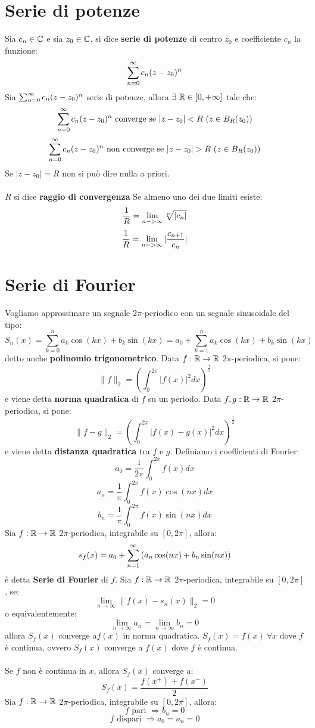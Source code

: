 \section{Serie di potenze}
Sia $c_n \in \mathbb{C}$ e sia $z_0 \in \mathbb{C}$, si dice \textbf{serie di potenze} di centro $z_0$ e coefficiente $c_n$ la funzione:
$$\sum_{n=0}^{\infty} c_n (z-z_0)^n$$
\thh
Sia $\sum_{n=0}^{\infty} c_n (z-z_0)^n$ serie di potenze, allora $\exists \ \mathbb{R} \in [0, +\infty] $ tale che:
$$\sum_{n=0}^{\infty} c_n (z-z_0)^n  \text{ converge se } |z-z_0|<R \ (z \in B_R(z_0))$$
$$\suminf{0} c_n (z-z_0)^n  \text{ non converge se } |z-z_0|>R \ (z \in B_R(z_0))$$
Se $|z-z_0|=R$ non si può dire nulla a priori.\\
\\
$R$ si dice \textbf{raggio di convergenza}
\prop
Se almeno uno dei due limiti esiste:
$$\frac{1}{R}=\lim\limits_{n->\infty} \sqrt[n]{|c_n|}$$
$$\frac{1}{R}=\lim\limits_{n->\infty} |\frac{c_{n+1}}{c_n}|$$
\section{Serie di Fourier}
Vogliamo approssimare un segnale $2\pi$-periodico con un segnale sinusoidale del tipo:
$$S_n(x)=\sum_{k=0}^{n}a_k \cos{(kx)} + b_k \sin{(kx)}=a_0+\sum_{k=1}^{n}a_k \cos{(kx)} + b_k \sin{(kx)}$$
detto anche \textbf{polinomio trigonometrico}.
Data $f:\mathbb{R} \rightarrow \mathbb{R}$ $2\pi$-periodica, si pone:
$$\|f\|_2=\left( \int_0^{2\pi}|f(x)|^2 dx \right)^{\frac 12}$$
e viene detta \textbf{norma quadratica} di $f$ su un periodo.
Data $f,g:\mathbb{R} \rightarrow \mathbb{R}$ $2\pi$-periodica, si pone:
$$\|f-g\|_2=\left( \int_0^{2\pi}|f(x)-g(x)|^2 dx \right)^{\frac 12}$$
e viene detta \textbf{distanza quadratica} tra $f$ e $g$.
Definiamo i coefficienti di Fourier:
$$a_0=\frac{1}{2 \pi}\int_{0}^{2\pi}f(x)dx$$
$$a_n=\frac{1}{\pi}\int_{0}^{2\pi}f(x)\cos(nx)dx$$
$$b_n=\frac{1}{\pi}\int_{0}^{2\pi}f(x)\sin(nx)dx$$
Sia $f:\mathbb{R} \rightarrow \mathbb{R}$ $2\pi$-periodica, integrabile su $[0,2\pi]$, allora:
$$s_f(x)=a_0+\sum_{n=1}^{\infty}\left(a_n \cos (nx)+ b_n \sin (nx)\right)$$
è detta \textbf{Serie di Fourier} di $f$.
\thh
Sia $f:\mathbb{R} \rightarrow \mathbb{R}$ $2\pi$-periodica, integrabile su $[0,2\pi]$, se:
$$\lim\limits_{n \rightarrow \infty} \|f(x)-s_n(x)\|_2=0$$
o equivalentemente:
$$\lim\limits_{n \rightarrow \infty} a_n=\lim\limits_{n \rightarrow \infty} b_n =0$$
allora $S_f(x)$ converge a$f(x)$ in norma quadratica.
\prop
$S_f(x)=f(x) \ \forall x$  dove $f$ è continua, ovvero $S_f(x)$ converge a $f(x)$ dove $f$ è continua.\\
\\
Se $f$ non è continua in $x$, allora $S_f(x)$ converge a:
$$S_f(x)=\frac{f(x^+)+f(x^-)}{2}$$
\oss
Sia $f:\mathbb{R} \rightarrow \mathbb{R}$ $2\pi$-periodica, integrabile su $[0,2\pi]$,  allora:
$$f \text{ pari } \Rightarrow b_n=0$$
$$f \text{ dispari } \Rightarrow a_0= a_n=0$$
